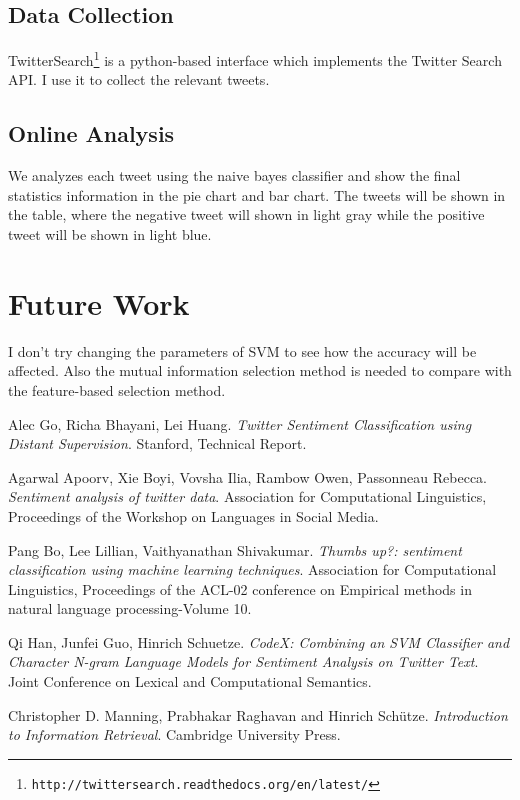 \documentclass{article}
\begin{document}
\subsection{Data Collection}
TwitterSearch\footnote{\texttt{\scriptsize{http://twittersearch.readthedocs.org/en/latest/‎‎}}} is a python-based interface which implements the Twitter Search API. I use it to collect the relevant tweets.
\subsection{Online Analysis}
We analyzes each tweet using the naive bayes classifier and show the final statistics information in the pie chart and bar chart. The tweets will be shown in the table, where the negative tweet will shown in light gray while the positive tweet will be shown in light blue.

\section{Future Work}
I don't try changing the parameters of SVM to see how the accuracy will be affected. Also the mutual information selection method is needed to compare with the feature-based selection method.

\begin{thebibliography}{9}
  Alec Go, Richa Bhayani, Lei Huang.
  \emph{Twitter Sentiment Classification using Distant Supervision}.
  Stanford,
  Technical Report.

  Agarwal Apoorv, Xie Boyi, Vovsha Ilia, Rambow Owen, Passonneau Rebecca.
  \emph{Sentiment analysis of twitter data}.
  Association for Computational Linguistics,
  Proceedings of the Workshop on Languages in Social Media.

  Pang Bo, Lee Lillian, Vaithyanathan Shivakumar.
  \emph{Thumbs up?: sentiment classification using machine learning techniques}.
  Association for Computational Linguistics,
  Proceedings of the ACL-02 conference on Empirical methods in natural language processing-Volume 10.

  Qi Han, Junfei Guo, Hinrich Schuetze.
  \emph{CodeX: Combining an SVM Classifier and Character N-gram Language Models for Sentiment Analysis on Twitter Text}.
  Joint Conference on Lexical and Computational Semantics.

  Christopher D. Manning, Prabhakar Raghavan and Hinrich Schütze.
  \emph{Introduction to Information Retrieval}.
  Cambridge University Press.

\end{thebibliography}
\end{document}
